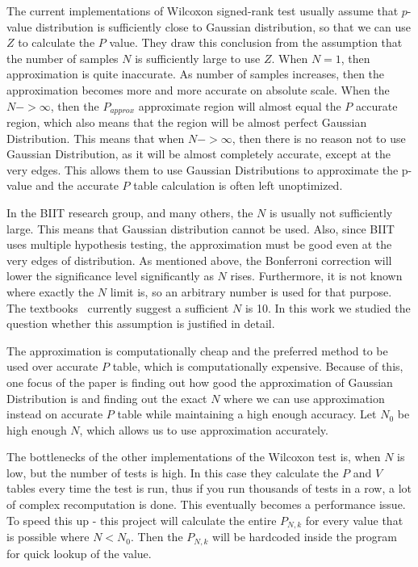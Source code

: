 \documentclass[12pt]{article}
\begin{document}
{The current implementations of Wilcoxon signed-rank test usually assume that $p$-value distribution is sufficiently close to Gaussian distribution, so that we can use $Z$ to calculate the $P$ value. They draw this conclusion from the assumption that the number of samples $N$ is sufficiently large to use $Z$. When $N = 1$, then approximation is quite inaccurate. As number of samples increases, then the approximation becomes more and more accurate on absolute scale. When the $N->\infty$, then the $P_{approx}$ approximate region will almost equal the $P$ accurate region, which also means that the region will be almost perfect Gaussian Distribution. This means that when $N->\infty$, then there is no reason not to use Gaussian Distribution, as it will be almost completely accurate, except at the very edges. This allows them to use Gaussian Distributions to approximate the p-value and the accurate $P$ table calculation is often left unoptimized.

In the BIIT research group, and many others, the $N$ is usually not sufficiently large. This means that Gaussian distribution cannot be used. Also, since BIIT uses multiple hypothesis testing, the approximation must be good even at the very edges of distribution. As mentioned above, the Bonferroni correction will lower the significance level significantly as $N$ rises. Furthermore, it is not known where exactly the $N$ limit is, so an arbitrary number is used for that purpose. The textbooks~\cite{lowry_concepts} currently suggest a sufficient $N$ is 10. In this work we studied the question whether this assumption is justified in detail.

The approximation is computationally cheap and the preferred method to be used over accurate $P$ table, which is computationally expensive. Because of this, one focus of the paper is finding out how good the approximation of Gaussian Distribution is and finding out the exact $N$ where we can use approximation instead on accurate $P$ table while maintaining a high enough accuracy. Let $N_0$ be high enough $N$, which allows us to use approximation accurately.

The bottlenecks of the other implementations of the Wilcoxon test is, when $N$ is low, but the number of tests is high. In this case they calculate the $P$ and $V$ tables every time the test is run, thus if you run thousands of tests in a row, a lot of complex recomputation is done. This eventually becomes a performance issue. To speed this up - this project will calculate the entire $P_{N, k}$ for every value that is possible where $N < N_0$. Then the $P_{N, k}$ will be hardcoded inside the program for quick lookup of the value.


}
\end{document}

